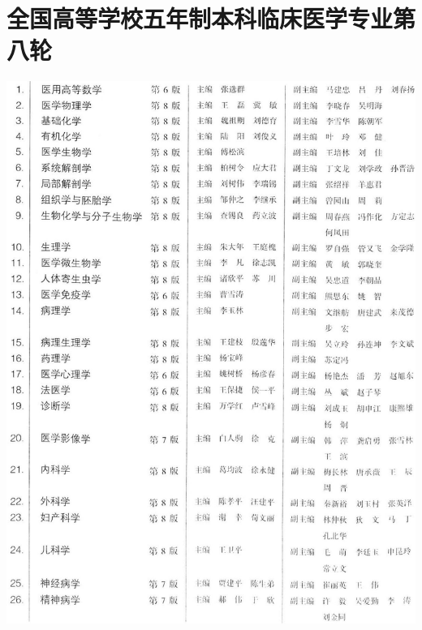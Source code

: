 \documentclass[10pt]{article}
\begin{document}
\section*{全国高等学校五年制本科临床医学专业第八轮}
\begin{center}
\includegraphics[max width=\textwidth]{2024_07_09_002a177993bd97d1d6d7g-006}
\end{center}
\end{document}
